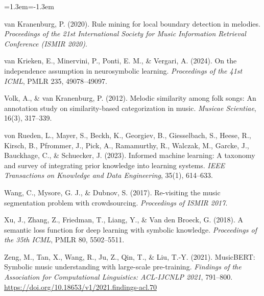 \documentclass[a4paper]{article}
\newenvironment{reflist}{\begin{list}{}{\leftmargin=1.3em\itemindent=-1.3em\itemsep=0pt\parsep=0pt}\fontsize{9}{9.5}\selectfont}{\end{list}}
\begin{document}
\begin{reflist}
\item van Kranenburg, P. (2020). Rule mining for local boundary detection in melodies. \emph{Proceedings of the 21st International Society for Music Information Retrieval Conference (ISMIR 2020)}.
\item van Krieken, E., Minervini, P., Ponti, E. M., \& Vergari, A. (2024). On the independence assumption in neurosymbolic learning. \emph{Proceedings of the 41st ICML}, PMLR 235, 49078--49097.
\item Volk, A., \& van Kranenburg, P. (2012). Melodic similarity among folk songs: An annotation study on similarity-based categorization in music. \emph{Musicae Scientiae}, 16(3), 317--339.
\item von Rueden, L., Mayer, S., Beckh, K., Georgiev, B., Giesselbach, S., Heese, R., Kirsch, B., Pfrommer, J., Pick, A., Ramamurthy, R., Walczak, M., Garcke, J., Bauckhage, C., \& Schuecker, J. (2023). Informed machine learning: A taxonomy and survey of integrating prior knowledge into learning systems. \emph{IEEE Transactions on Knowledge and Data Engineering}, 35(1), 614--633.
\item Wang, C., Mysore, G. J., \& Dubnov, S. (2017). Re-visiting the music segmentation problem with crowdsourcing. \emph{Proceedings of ISMIR 2017}.
\item Xu, J., Zhang, Z., Friedman, T., Liang, Y., \& Van den Broeck, G. (2018). A semantic loss function for deep learning with symbolic knowledge. \emph{Proceedings of the 35th ICML}, PMLR 80, 5502--5511.
\item Zeng, M., Tan, X., Wang, R., Ju, Z., Qin, T., \& Liu, T.-Y. (2021). MusicBERT: Symbolic music understanding with large-scale pre-training. \emph{Findings of the Association for Computational Linguistics: ACL-IJCNLP 2021}, 791--800. \url{https://doi.org/10.18653/v1/2021.findings-acl.70}
\end{reflist}

\clearpage
\end{document}
